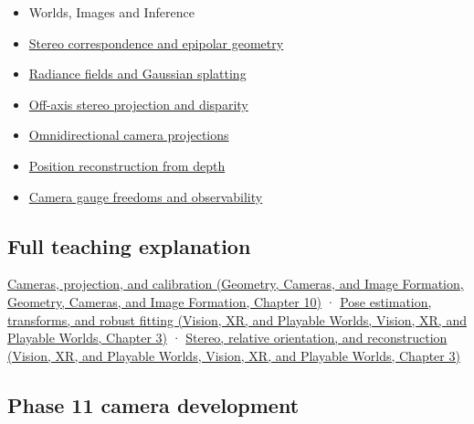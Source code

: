 \begin{itemize}
\item
  {Worlds, Images and Inference}
\item
  \hyperref[appendix-c4e98b6e4001]{Stereo correspondence and epipolar geometry}
\item
  \hyperref[appendix-c5b332e400e7]{Radiance fields and Gaussian splatting}
\item
  \hyperref[appendix-0976e86e5b9f]{Off-axis stereo projection and disparity}
\item
  \hyperref[appendix-fc99ad39f351]{Omnidirectional camera projections}
\item
  \hyperref[appendix-2cbf2968e866]{Position reconstruction from depth}
\item
  \hyperref[appendix-113f0267e5f4]{Camera gauge freedoms and observability}
\end{itemize}

\subsection{Full teaching explanation}\label{appendix-3ee9861904d5-full-teaching-explanation}

\href{../03-Geometry-Cameras-and-Image-Formation/main.pdf\#nameddest=03-visual-computing-i-ch003-cameras-projection-and-calibration}{Cameras, projection, and calibration (Geometry, Cameras, and Image Formation, Geometry, Cameras, and Image Formation, Chapter 10)} · \href{../07-Vision-XR-and-Playable-Worlds/main.pdf\#nameddest=04-visual-computing-ii-ch032-pose-estimation-transforms-and-robust-fitting}{Pose estimation, transforms, and robust fitting (Vision, XR, and Playable Worlds, Vision, XR, and Playable Worlds, Chapter 3)} · \href{../07-Vision-XR-and-Playable-Worlds/main.pdf\#nameddest=04-visual-computing-ii-ch032-stereo-relative-orientation-and-reconstruction}{Stereo, relative orientation, and reconstruction (Vision, XR, and Playable Worlds, Vision, XR, and Playable Worlds, Chapter 3)}

\subsection{Phase 11 camera development}\label{appendix-3ee9861904d5-phase-11-camera-development}

